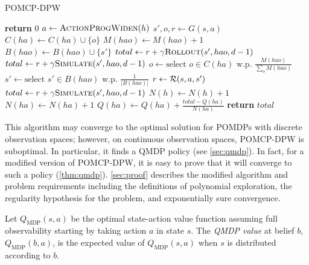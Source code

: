 \begin{algorithm}[htbp]
    \caption{POMCP-DPW} \label{alg:pomcpdpw}
    \begin{algorithmic}[1]
                \State \textbf{return} $0$
            \EndIf
            \State $a \gets \Call{ActionProgWiden}{h}$
                \State $s',o,r \gets G(s,a)$
                \State $C(ha) \gets C(ha) \cup \{o\}$
                \State $M(hao) \gets M(hao) + 1$
                \State $B(hao) \gets B(hao) \cup \{s'\}$ \label{lin:insertion}
                    \State $total \gets r + \gamma \Call{Rollout}{s', hao, d-1}$
                \Else
                    \State $total \gets r + \gamma \Call{Simulate}{s', hao, d-1}$
                \EndIf
            \Else \label{lin:notnew}
                \State $o \gets \text{select } o \in C(ha) \text{ w.p. } \frac{M(hao)}{\sum_{o} M(hao)}$ \label{lin:selecto}
                \State $s' \gets \text{select } s' \in B(hao) \text{ w.p. } \frac{1}{|B(hao)|}$ \label{lin:samples}
                \State $r \gets \mathcal{R}(s,a,s')$
                \State $total \gets r + \gamma \Call{Simulate}{s', hao, d-1}$
            \EndIf
            \State $N(h) \gets N(h)+1$
            \State $N(ha) \gets N(ha)+1$
            \State $Q(ha) \gets Q(ha) + \frac{total - Q(ha)}{N(ha)}$
            \State \textbf{return} $total$
        \EndProcedure
    \end{algorithmic}
\end{algorithm}

This algorithm may converge to the optimal solution for POMDPs with discrete observation spaces; however, on continuous observation spaces, POMCP-DPW is suboptimal.
In particular, it finds a QMDP policy (see \cref{sec:qmdp}).
In fact, for a modified version of POMCP-DPW, it is easy to prove that it will converge to such a policy (\cref{thm:qmdp}).
\cref{sec:proof} describes the modified algorithm and problem requirements including the definitions of polynomial exploration, the regularity hypothesis for the problem, and exponentially sure convergence.

\begin{definition}
    Let $Q_\text{MDP}(s,a)$ be the optimal state-action value function assuming full observability starting by taking action $a$ in state $s$. The \emph{QMDP value} at belief $b$, $Q_\text{MDP}(b,a)$, is the expected value of $Q_\text{MDP}(s,a)$ when $s$ is distributed according to $b$.
\end{definition}

